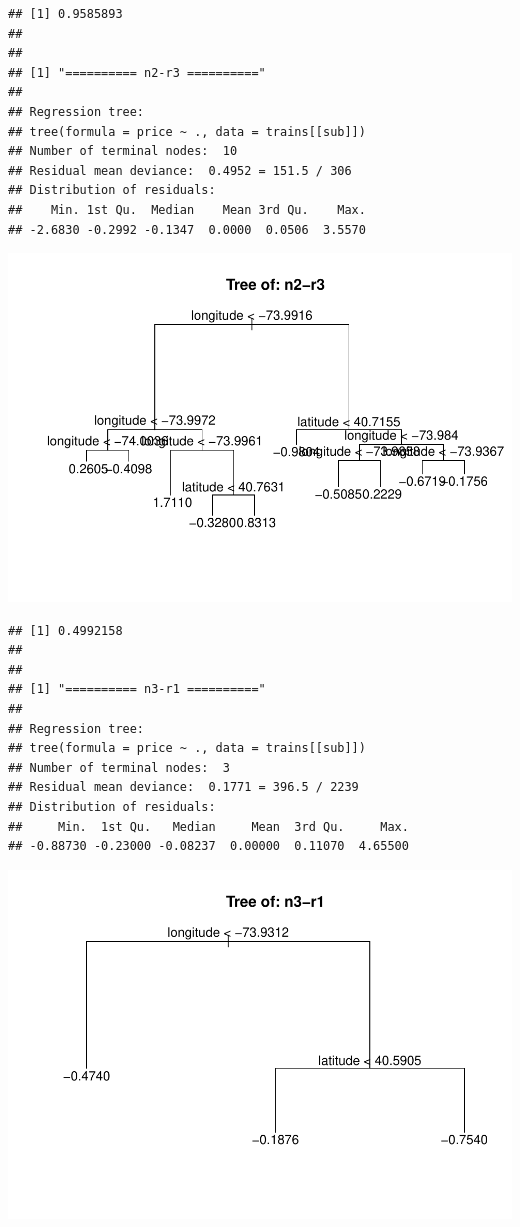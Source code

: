 \documentclass[
]{article}
\begin{document}
\begin{verbatim}
## [1] 0.9585893
## 
## 
## [1] "========== n2-r3 =========="
## 
## Regression tree:
## tree(formula = price ~ ., data = trains[[sub]])
## Number of terminal nodes:  10 
## Residual mean deviance:  0.4952 = 151.5 / 306 
## Distribution of residuals:
##    Min. 1st Qu.  Median    Mean 3rd Qu.    Max. 
## -2.6830 -0.2992 -0.1347  0.0000  0.0506  3.5570
\end{verbatim}

\includegraphics{project-code_files/figure-latex/unnamed-chunk-14-11.pdf}

\begin{verbatim}
## [1] 0.4992158
## 
## 
## [1] "========== n3-r1 =========="
## 
## Regression tree:
## tree(formula = price ~ ., data = trains[[sub]])
## Number of terminal nodes:  3 
## Residual mean deviance:  0.1771 = 396.5 / 2239 
## Distribution of residuals:
##     Min.  1st Qu.   Median     Mean  3rd Qu.     Max. 
## -0.88730 -0.23000 -0.08237  0.00000  0.11070  4.65500
\end{verbatim}

\includegraphics{project-code_files/figure-latex/unnamed-chunk-14-12.pdf}
\end{document}
